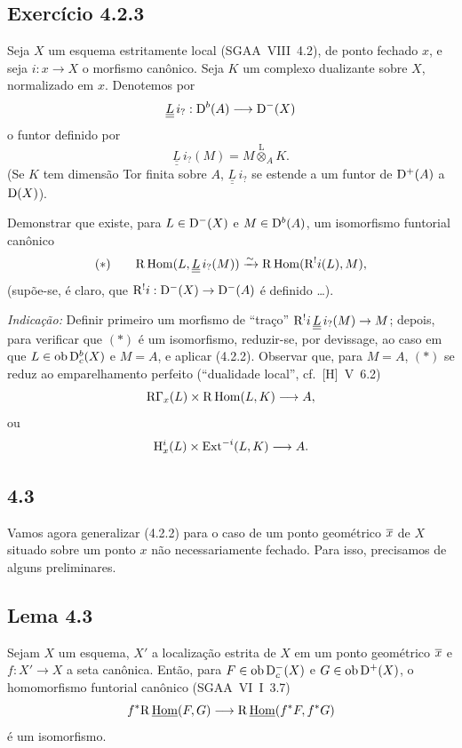 \subsection*{Exercício 4.2.3}
Seja $X$ um esquema estritamente local (SGAA~VIII~4.2), de ponto fechado $x$, e seja $i : x \to X$ o morfismo canônico. Seja $K$ um complexo dualizante sobre $X$, normalizado em $x$. Denotemos por
\[
\underline{\underline L}\, i_? : \mathrm{D}^b(A)\longrightarrow \mathrm{D}^-(X)
\]
o funtor definido por
\[
\underline{\underline L}\, i_?(M)=M\overset{\mathrm L}{\otimes}_A K.
\]
(Se $K$ tem dimensão Tor finita sobre $A$, $\underline{\underline L}\, i_?$ se estende a um funtor de $\mathrm{D}^+(A)$ a $\mathrm{D}(X)$).

Demonstrar que existe, para $L \in \mathrm{D}^-(X)$ e $M \in \mathrm{D}^b(A)$, um isomorfismo funtorial canônico
\[
(*)\qquad \mathrm{R}\operatorname{Hom}(L,\underline{\underline L}\, i_?(M))\xrightarrow{\sim}\mathrm{R}\operatorname{Hom}(\mathrm{R}^{!}i(L),M),
\]
(supõe-se, é claro, que $\mathrm{R}^{!}i : \mathrm{D}^-(X) \to \mathrm{D}^-(A)$ é definido \dots).

\emph{Indicação:} Definir primeiro um morfismo de ``traço'' $\mathrm{R}^{!}i\,\underline{\underline L}\, i_?(M) \to M$; depois, para verificar que $(*)$ é um isomorfismo, reduzir-se, por devissage, ao caso em que $L \in \operatorname{ob} \mathrm{D}_c^b(X)$ e $M = A$, e aplicar (4.2.2). Observar que, para $M = A$, $(*)$ se reduz ao emparelhamento perfeito (``dualidade local'', cf.~[H]~V~6.2)
\[
\mathrm{R}\Gamma_x(L)\times \mathrm{R}\operatorname{Hom}(L,K)\longrightarrow A,
\]
ou
\[
\mathrm{H}_x^i(L)\times \operatorname{Ext}^{-i}(L,K)\longrightarrow A.
\]

\subsection*{4.3}
Vamos agora generalizar (4.2.2) para o caso de um ponto geométrico $\overline{x}$ de $X$ situado sobre um ponto $x$ não necessariamente fechado. Para isso, precisamos de alguns preliminares.

\subsection*{Lema 4.3}
Sejam $X$ um esquema, $X'$ a localização estrita de $X$ em um ponto geométrico $\overline{x}$ e $f : X' \to X$ a seta canônica. Então, para $F \in \operatorname{ob} \mathrm{D}_c^-(X)$ e $G \in \operatorname{ob} \mathrm{D}^+(X)$, o homomorfismo funtorial canônico (SGAA~VI~I~3.7)
\[
f^*\mathrm{R}\,\underline{\operatorname{Hom}}(F,G)\longrightarrow \mathrm{R}\,\underline{\operatorname{Hom}}(f^*F,f^*G)
\]
é um isomorfismo.

